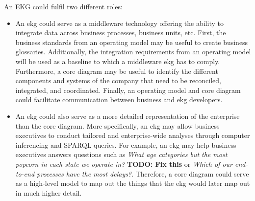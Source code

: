%
%
An EKG could fulfil two different roles:

\begin{itemize}
    \item An \gls{ekg} could serve as a middleware technology offering the ability to integrate data across
          business processes, business units, etc.
          First, the business standards from an operating model may be useful to create business glossaries.
          Additionally, the integration requirements from an operating model will be used as a baseline to
          which a middleware \gls{ekg} has to comply.
          Furthermore, a core diagram may be useful to identify the different components and systems of
          the company that need to be reconciled, integrated, and coordinated.
          Finally, an operating model and core diagram could facilitate communication between business
          and \gls{ekg} developers.
    \item An \gls{ekg} could also serve as a more detailed representation of the enterprise than the core diagram.
          More specifically, an \gls{ekg} may allow business executives to conduct tailored and
          enterprise-wide analyses through computer inferencing and SPARQL-queries.
          For example, an \gls{ekg} may help business executives answers questions such as
          \textit{What age categories but the most popcorn in each state we operate in?} \textbf{TODO: Fix this} or
          \textit{Which of our end-to-end processes have the most delays?}.
          Therefore, a core diagram could serve as a high-level model to map out the things that the \gls{ekg}
          would later map out in much higher detail.
\end{itemize}


